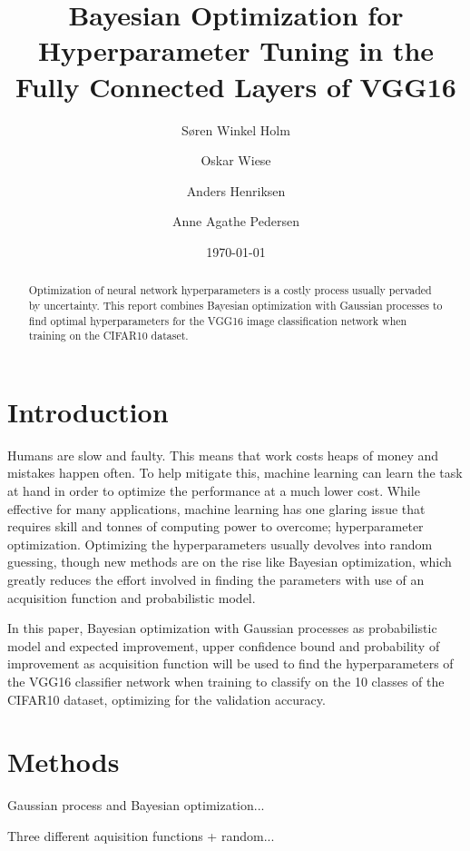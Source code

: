 \documentclass[12pt,fleqn]{article}
\title{Bayesian Optimization for Hyperparameter Tuning in the Fully Connected Layers of VGG16}
\author{Søren Winkel Holm\and Oskar Wiese\and Anders Henriksen\and Anne Agathe Pedersen}
\date{\today}
\begin{document}
\maketitle


\begin{abstract}

Optimization of neural network hyperparameters is a costly process usually pervaded by uncertainty. 
This report combines Bayesian optimization with Gaussian processes to find optimal hyperparameters for the VGG16 image classification network when training on the CIFAR10 dataset. 

\end{abstract}


\section{Introduction} 
Humans are slow and faulty. This means that work costs heaps of money and mistakes happen often. To help mitigate this, machine learning can learn the task at hand in order to optimize the performance at a much lower cost. While effective for many applications, machine learning has one glaring issue that requires skill and tonnes of computing power to overcome; hyperparameter optimization. Optimizing the hyperparameters usually devolves into random guessing, though new methods are on the rise like Bayesian optimization, which greatly reduces the effort involved in finding the parameters with use of an acquisition function and probabilistic model.

In this paper, Bayesian optimization with Gaussian processes as probabilistic model and expected improvement, upper confidence bound and probability of improvement as acquisition function will be used to find the hyperparameters of the VGG16 classifier network when training to classify on the 10 classes of the CIFAR10 dataset, optimizing for the validation accuracy.


\section{Methods}
Gaussian process and Bayesian optimization...

Three different aquisition functions + random...
\end{document}
